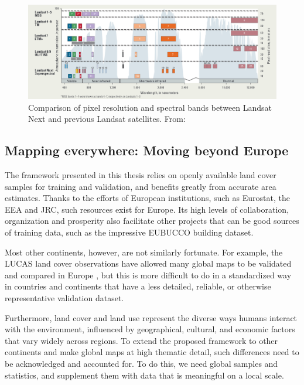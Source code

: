             \begin{figure}[H]
            \centering
            \includegraphics[width=1\linewidth]{figs_06/landsat_next.png}
            \caption{Comparison of pixel resolution and spectral bands between Landsat Next and previous Landsat satellites. From: \citep{USGS2024LandsatNext}}
            \label{fig:landsat_next}
            \end{figure}
        
    \subsection{Mapping everywhere: Moving beyond Europe}
    \label{syn:everywhere}

        The framework presented in this thesis relies on openly available land cover samples for training and validation, and benefits greatly from accurate area estimates. Thanks to the efforts of European institutions, such as Eurostat, the EEA and JRC, such resources exist for Europe. Its high levels of collaboration, organization and prosperity also facilitate other projects that can be good sources of training data, such as the impressive EUBUCCO \citep{milojevic2023eubucco} building dataset.
        
        Most other continents, however, are not similarly fortunate. For example, the LUCAS land cover observations \citep{dandrimont2020harmonised} have allowed many global maps to be validated and compared in Europe \citep{gao2020consistency,venter2022global}, but this is more difficult to do in a standardized way in countries and continents that have a less detailed, reliable, or otherwise representative validation dataset.

        Furthermore, land cover and land use represent the diverse ways humans interact with the environment, influenced by geographical, cultural, and economic factors that vary widely across regions. To extend the proposed framework to other continents and make global maps at high thematic detail, such differences need to be acknowledged and accounted for. To do this, we need global samples and statistics, and supplement them with data that is meaningful on a local scale.

